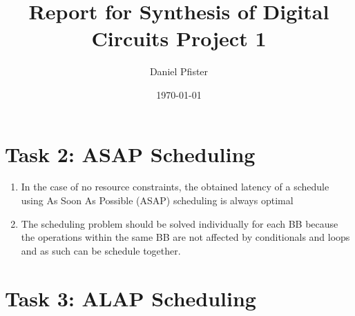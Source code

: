 \documentclass{article}
\title{Report for Synthesis of Digital Circuits Project 1}
\author{Daniel Pfister}
\date{\today}
\begin{document}
    \maketitle
    \section{Task 2: ASAP Scheduling}

    \begin{enumerate}
        \item In the case of no resource constraints, the obtained latency of a schedule using As Soon As Possible (ASAP) scheduling is always optimal
        \item The scheduling problem should be solved individually for each BB because the operations within the same BB are not affected by conditionals and loops and as such can be schedule together.
    \end{enumerate}

    \section{Task 3: ALAP Scheduling}
\end{document}
